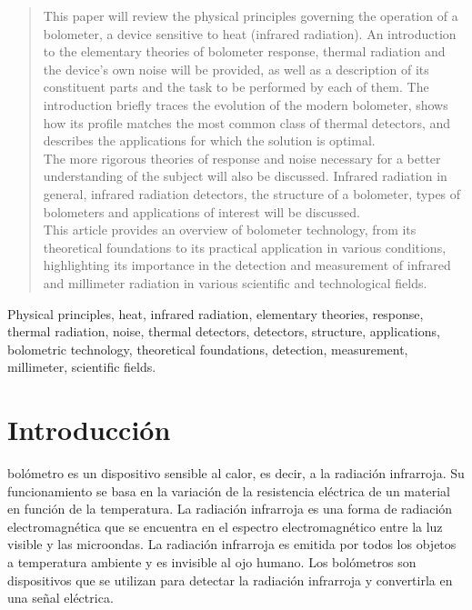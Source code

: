 \documentclass[a4paper,journal]{IEEEtran}
\begin{document}
\begin{abstract}
This paper will review the physical principles governing the operation of a bolometer, a device sensitive to heat (infrared radiation). An introduction to the elementary theories of bolometer response, thermal radiation and the device's own noise will be provided, as well as a description of its constituent parts and the task to be performed by each of them. The introduction briefly traces the evolution of the modern bolometer, shows how its profile matches the most common class of thermal detectors, and describes the applications for which the solution is optimal.
\\The more rigorous theories of response and noise necessary for a better understanding of the subject will also be discussed. Infrared radiation in general, infrared radiation detectors, the structure of a bolometer, types of bolometers and applications of interest will be discussed. 
\\This article provides an overview of bolometer technology, from its theoretical foundations to its practical application in various conditions, highlighting its importance in the detection and measurement of infrared and millimeter radiation in various scientific and technological fields. 
\end{abstract}
\begin{IEEEkeywords}
Physical principles, heat, infrared radiation, elementary theories, response, thermal radiation, noise, thermal detectors, detectors, structure, applications, bolometric technology, theoretical foundations, detection, measurement, millimeter, scientific fields.
\end{IEEEkeywords}
\vspace{0.5cm}
\section{Introducción}
 bolómetro es un dispositivo sensible al calor, es decir, a la radiación infrarroja. Su funcionamiento se basa en la variación de la resistencia eléctrica de un material en función de la temperatura. La radiación infrarroja es una forma de radiación electromagnética que se encuentra en el espectro electromagnético entre la luz visible y las microondas. La radiación infrarroja es emitida por todos los objetos a temperatura ambiente y es invisible al ojo humano. Los bolómetros son dispositivos que se utilizan para detectar la radiación infrarroja y convertirla en una señal eléctrica.
\end{document}
